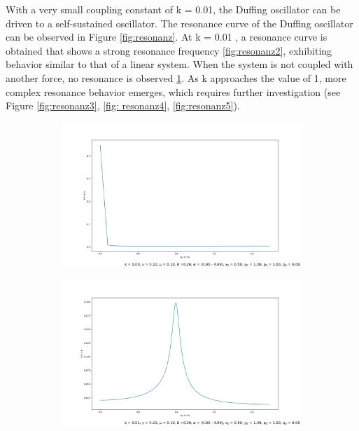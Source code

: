 \documentclass[oneside,10pt,a4paper]{report}
\begin{document}
		With a very small coupling constant of 
		k = 0.01, the Duffing oscillator can be driven to a self-sustained oscillator. The resonance curve of the Duffing oscillator can be observed in Figure \ref{fig:resonanz}. At 
		k = 0.01 , a resonance curve is obtained that shows a strong resonance frequency \ref{fig:resonanz2}, exhibiting behavior similar to that of a linear system. When the system is not coupled with another force, no resonance is observed \ref{fig:resonanz1}. As 
		k approaches the value of 1, more complex resonance behavior emerges, which requires further investigation (see Figure \ref{fig:resonanz3}, \ref{fig: resonanz4}, \ref{fig:resonanz5}).
	\begin{figure}[H]
		\centering
		\begin{subfigure}[b]{0.45\textwidth}
			\includegraphics[width=\textwidth]{resonanz1.png}
			\caption{}
			\label{fig:resonanz1}
		\end{subfigure}
		\hfill
		\begin{subfigure}[b]{0.45\textwidth}
			\includegraphics[width=\textwidth]{resonanz2.png}

\end{subfigure}
\end{figure}
\end{document}
